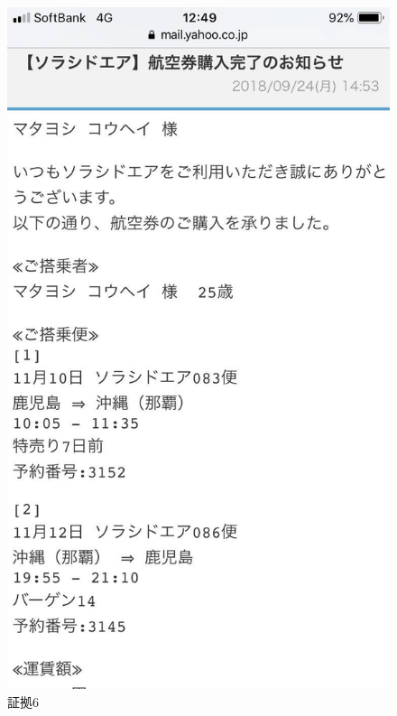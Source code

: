 \begin{figure}[H]
  \centering
  \includegraphics[clip,scale=0.2]{./section/Taira/figures/fig6}
  \caption{証拠6}
\label{fig6}
\end{figure}

